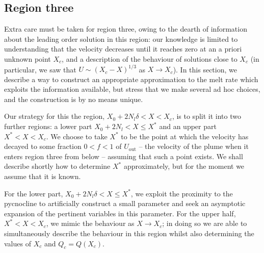 \documentclass{jfm}
\newcommand{\lt}{\delta} %
\newcommand{\out}{\text{out}}
\begin{document}
\subsection{Region three}\label{S:MeltRate:R3}
Extra care must be taken for region three, owing to the dearth of information about the leading order solution in this region: our knowledge is limited to understanding that the velocity decreases until it reaches zero at an a priori unknown point $X_c$, and a description of the behaviour of solutions close to $X_c$ (in particular, we saw that $U \sim (X_c - X)^{1/3}$ as $X \to X_c$). In this section, we describe a way to construct an appropriate approximation to the melt rate which exploits the information available, but stress that we make several ad hoc choices, and the construction is by no means unique.

Our strategy for this the region, $X_0 + 2N_l \lt < X < X_c$, is to split it into two further regions: a lower part $X_0 + 2 N_l < X \leq X^*$ and an upper part $X^* < X < X_c$. We choose to take $X^*$ to be the point at which the velocity has decayed to some fraction $0 < f < 1$ of $U_\out$ -- the velocity of the plume when it enters region three from below -- assuming that such a point exists. We shall describe shortly how to determine $X^*$ approximately, but for the moment we assume that it is known.

For the lower part, $X_0  + 2N_l \lt < X \leq X^*$, we exploit the proximity to the pycnocline to artificially construct a small parameter and seek an asymptotic expansion of the pertinent variables in this parameter. For the upper half, $X^* < X < X_c$, we mimic the behaviour as $X \to X_c$; in doing so we are able to simultaneously describe the behaviour in this region whilst also determining the values of $X_c$ and $Q_c = Q(X_c)$.
\end{document}

